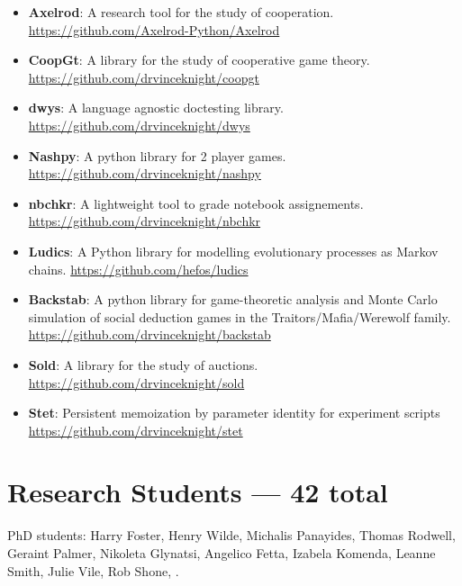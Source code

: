 \documentclass[10pt]{article}
\begin{document}
\begin{itemize}

  \item \textbf{Axelrod}: A research tool for the study of cooperation.
  \url{https://github.com/Axelrod-Python/Axelrod}

  \item \textbf{CoopGt}: A library for the study of cooperative game theory.
  \url{https://github.com/drvinceknight/coopgt}

  \item \textbf{dwys}: A language agnostic doctesting library.
  \url{https://github.com/drvinceknight/dwys}

  \item \textbf{Nashpy}: A python library for 2 player games.
  \url{https://github.com/drvinceknight/nashpy}

  \item \textbf{nbchkr}: A lightweight tool to grade notebook assignements.
  \url{https://github.com/drvinceknight/nbchkr}

  \item \textbf{Ludics}: A Python library for modelling evolutionary processes as Markov chains.
  \url{https://github.com/hefos/ludics}

  \item \textbf{Backstab}: A python library for game-theoretic analysis and Monte Carlo simulation of social deduction games in the Traitors/Mafia/Werewolf family.
  \url{https://github.com/drvinceknight/backstab}

  \item \textbf{Sold}: A library for the study of auctions.
  \url{https://github.com/drvinceknight/sold}

  \item \textbf{Stet}: Persistent memoization by parameter identity for experiment scripts
  \url{https://github.com/drvinceknight/stet}

\end{itemize}

\section{Research Students --- 42 total}


PhD students: Harry Foster, Henry Wilde, Michalis Panayides, Thomas Rodwell, Geraint Palmer, Nikoleta Glynatsi, Angelico Fetta, Izabela Komenda, Leanne Smith, Julie Vile, Rob Shone, .
\end{document}
